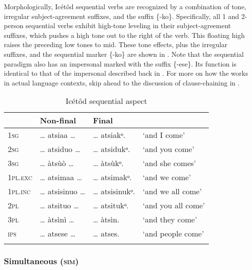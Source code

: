 Morphologically, Icétôd sequential verbs are recognized by a combination of tone, irregular subject-agreement suffixes, and the  suffix \{-ko\}. Specifically, all 1 and 2-person sequential verbs exhibit high-tone leveling in their subject-agreement suffixes, which pushes a high tone out to the right of the verb. This floating high raises the preceding low tones to mid. These tone effects, plus the irregular suffixes, and the sequential marker \{-ko\} are shown in . Note that the sequential paradigm also has an impersonal  marked with the suffix \{-ese\}. Its function is identical to that of the impersonal  described back in . For more on how the  works in actual language contexts, skip ahead to the discussion of clause-chaining in .


\begin{table}
\caption{Icétôd sequential aspect}
\label{tab:verbs:seq}


\begin{tabularx}{\textwidth}{XXXl}
\lsptoprule

& Non-final & Final & \\
\midrule
\textsc{1sg} & {\dots} atsiaa {\dots} & {\dots} atsiakᵒ. & ‘and I come’\\
\textsc{2sg} & {\dots} atsiduo {\dots} & {\dots} atsidukᵒ. & ‘and you come’\\
\textsc{3sg} & {\dots} àtsùò {\dots} & {\dots} àtsùkᵒ. & ‘and she comes’\\
\textsc{1pl.exc} & {\dots} atsimaa {\dots} & {\dots} atsimakᵒ. & ‘and we come’\\
\textsc{1pl.inc} & {\dots} atsisinuo {\dots} & {\dots} atsisinukᵒ. & ‘and we all come’\\
\textsc{2pl} & {\dots} atsituo {\dots} & {\dots} atsitukᵒ. & ‘and you all come’\\
\textsc{3pl} & {\dots} àtsìnì {\dots} & {\dots} àtsìn. & ‘and they come’\\
\textsc{ips} & {\dots} atsese {\dots} & {\dots} atses. & ‘and people come’\\
\lspbottomrule
\end{tabularx}
\end{table}



\subsubsection{Simultaneous (\textsc{sim})}\label{sec:8.10.8}

